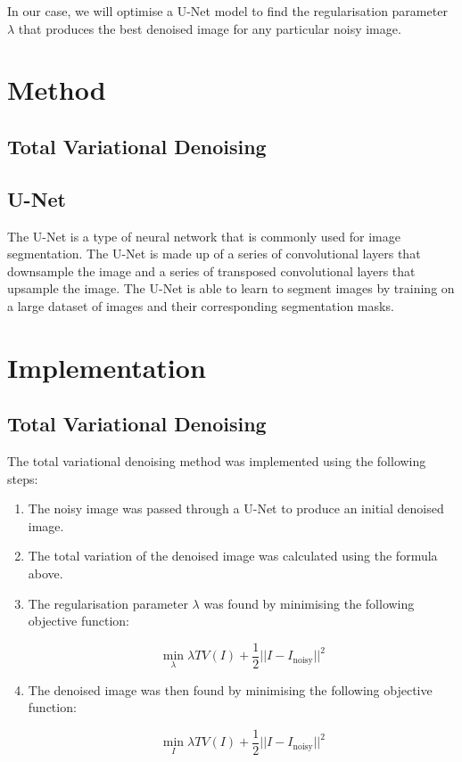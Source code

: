 \documentclass[12pt]{article}
\begin{document}
In our case, we will optimise a U-Net model to find the regularisation parameter $\lambda$ that produces the best denoised image for any particular noisy image.

\section{Method}

\subsection{Total Variational Denoising}



\subsection{U-Net}

The U-Net is a type of neural network that is commonly used for image segmentation.
The U-Net is made up of a series of convolutional layers that downsample the image and a series of transposed convolutional layers that upsample the image.
The U-Net is able to learn to segment images by training on a large dataset of images and their corresponding segmentation masks.

\section{Implementation}

\subsection{Total Variational Denoising}

The total variational denoising method was implemented using the following steps:

\begin{enumerate}
    \item The noisy image was passed through a U-Net to produce an initial denoised image.
    \item The total variation of the denoised image was calculated using the formula above.
    \item The regularisation parameter $\lambda$ was found by minimising the following objective function:
    
    \[
    \min_{\lambda} \lambda TV(I) + \frac{1}{2} ||I - I_{\text{noisy}}||^2
    \]
    
    \item The denoised image was then found by minimising the following objective function:
    
    \[
    \min_{I} \lambda TV(I) + \frac{1}{2} ||I - I_{\text{noisy}}||^2
    \]
\end{enumerate}
\end{document}
